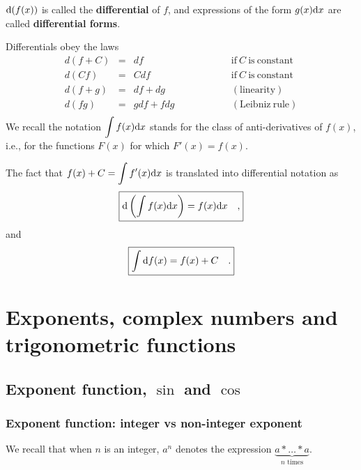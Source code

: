 \documentclass[12pt]{book}
\newcommand{\importantFormula}[1]{\begin{equation} \boxed{#1} \end{equation}}
\renewcommand{\emph}{\textbf}
\begin{document}
${\normalfont \text{d}} (f(x))$ is called the \emph{differential} of $f$, and expressions of the form $g(x){\normalfont \text{d}} x$ are called \emph{differential forms}.

Differentials obey the laws
\[
\begin{array}{rcll}
d(f+C)&=&df \quad \quad &\mathrm{if~} C \mathrm{~is~constant}\\
d(Cf)&=&Cdf \quad \quad &\mathrm{if~} C \mathrm{~is~constant}\\
d(f+g)&=&df+dg \quad\quad\quad\quad \quad &(\mathrm{linearity})\\
d(fg)&=&gdf+fdg \quad\quad\quad\quad \quad &(\mathrm{Leibniz~rule})\\
\end{array}
\]
We recall the notation $\displaystyle \int f(x){\normalfont \text{d}} x$ stands for the class of anti-derivatives of $f(x)$, i.e., for the functions $F(x)$ for which $F'(x) = f(x)$.

The fact that $f(x)+C=\displaystyle \int f'(x){\normalfont \text{d}} x$ is translated into differential notation as
\importantFormula{
\displaystyle \diff \left(\int f(x)\diff x\right)= f(x)\diff x\quad ,
}
and
\importantFormula{
\int \diff f(x)= f(x)+C\quad .
}



\chapter{Exponents, complex numbers and trigonometric functions}

\section{Exponent function, $\sin$ and $\cos$}
\subsection{Exponent function: integer vs non-integer exponent}
We recall that when $n$ is an integer,  $a^{n}$ denotes the expression $\underbrace{a*\dots *a}_{n\text{ times}}$.
\end{document}
